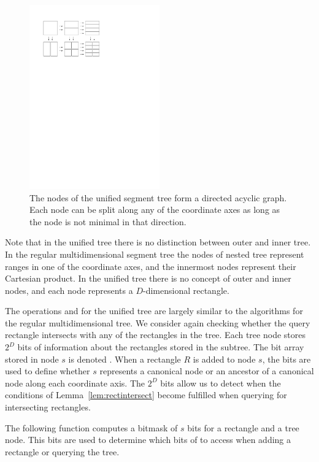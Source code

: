 \documentclass[english,gradu]{tktltiki2018}
\begin{document}
\begin{figure}\centering
	\includegraphics[width=0.5\textwidth]{fig/unified}
	\caption{The nodes of the unified segment tree form a directed acyclic graph.
	Each node can be split along any of the coordinate axes as long as the node is not minimal in that direction.}\label{fig:unified}
\end{figure}

Note that in the unified tree there is no distinction between outer and inner tree.
In the regular multidimensional segment tree the nodes of nested tree represent ranges in one of the coordinate axes, and the innermost nodes represent their Cartesian product.
In the unified tree there is no concept of outer and inner nodes, and each node represents a $D$-dimensional rectangle.

The operations \adddt and \checkdt for the unified tree are largely similar to the algorithms for the regular multidimensional tree.
We consider again checking whether the query rectangle intersects with any of the rectangles in the tree.
Each tree node stores $2^D$ bits of information about the rectangles stored in the subtree.
The bit array stored in node $s$ is denoted .
When a rectangle $R$ is added to node $s$, the bits are used to define whether $s$ represents a canonical node or an ancestor of a canonical node along each coordinate axis.
The $2^D$ bits allow us to detect when the conditions of Lemma~\ref{lem:rectintersect} become fulfilled when querying for intersecting rectangles.

The following function computes a bitmask of $s$ bits for a rectangle and a tree node.
This bits are used to determine which bits of  to access when adding a rectangle or querying the tree.
\end{document}
